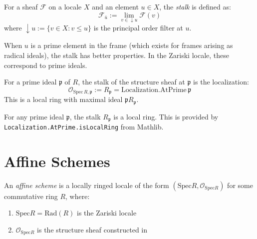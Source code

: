 \begin{definition}
  \label{def:stalk-locale}
  \leanok
  For a sheaf $\mathcal{F}$ on a locale $X$ and an element $u \in X$, the \emph{stalk} is defined as:
  $$\mathcal{F}_{\bar{u}} := \lim_{v \in \downarrow u} \mathcal{F}(v)$$
  where $\downarrow u := \{v \in X : v \leq u\}$ is the principal order filter at $u$.
\end{definition}

\begin{remark}
  \label{remark:stalks-prime-elements}
  When $u$ is a prime element in the frame (which exists for frames arising as radical ideals),
  the stalk has better properties. In the Zariski locale, these correspond to prime ideals.
\end{remark}

\begin{definition}
  \label{def:stalk-at-prime}
  \leanok
  For a prime ideal $\mathfrak{p}$ of $R$, the stalk of the structure sheaf at $\mathfrak{p}$ is the localization:
  $$\mathcal{O}_{\mathrm{Spec}\, R, \mathfrak{p}} := R_{\mathfrak{p}} = \mathrm{Localization.AtPrime}\, \mathfrak{p}$$
  This is a local ring with maximal ideal $\mathfrak{p} R_{\mathfrak{p}}$.
\end{definition}

\begin{theorem}
  \label{thm:stalk-at-prime-local}
  \leanok
  For any prime ideal $\mathfrak{p}$, the stalk $R_{\mathfrak{p}}$ is a local ring.
  This is provided by \texttt{Localization.AtPrime.isLocalRing} from Mathlib.
\end{theorem}

\section{Affine Schemes}

\begin{definition}
  \label{def:affine-scheme}
  \leanok
  An \emph{affine scheme} is a locally ringed locale of the form $(\mathrm{Spec} R, \mathcal{O}_{\mathrm{Spec} R})$
  for some commutative ring $R$, where:
  \begin{enumerate}
    \item $\mathrm{Spec} R = \mathrm{Rad}(R)$ is the Zariski locale
    \item $\mathcal{O}_{\mathrm{Spec} R}$ is the structure sheaf constructed in 
  \end{enumerate}
\end{definition}

